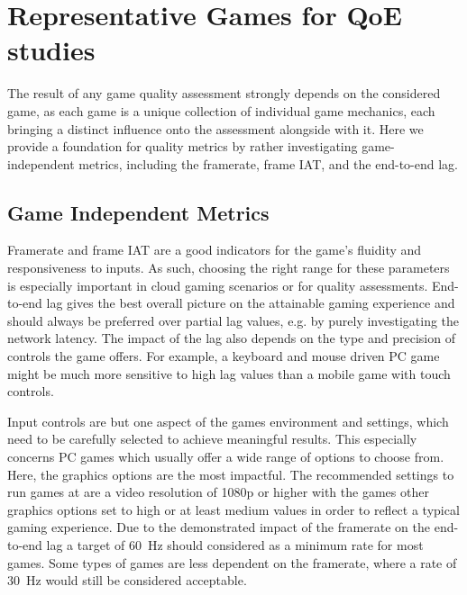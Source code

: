 \section{Representative Games for QoE studies}
\label{sec:game-criteria}

The result of any game quality assessment strongly depends on the considered game, as each game is a unique collection of individual game mechanics, each bringing a distinct influence onto the assessment alongside with it. Here we provide a foundation for quality metrics by rather investigating game-independent metrics, including the framerate, frame \gls{IAT}, and the end-to-end lag.


\subsection{Game Independent Metrics}
Framerate and frame \gls{IAT} are a good indicators for the game's fluidity and responsiveness to inputs. As such, choosing the right range for these parameters is especially important in cloud gaming scenarios or for quality assessments. End-to-end lag gives the best overall picture on the attainable gaming experience and should always be preferred over partial lag values, e.g. by purely investigating the network latency. The impact of the lag also depends on the type and precision of controls the game offers. For example, a keyboard and mouse driven PC game might be much more sensitive to high lag values than a mobile game with touch controls.

Input controls are but one aspect of the games environment and settings, which need to be carefully selected to achieve meaningful results. This especially concerns PC games which usually offer a wide range of options to choose from. Here, the graphics options are the most impactful. The recommended settings to run games at are a video resolution of 1080p or higher with the games other graphics options set to high or at least medium values in order to reflect a typical gaming experience. Due to the demonstrated impact of the framerate on the end-to-end lag a target of \SI{60}{\hertz} should considered as a minimum rate for most games. Some types of games are less dependent on the framerate, where a rate of \SI{30}{\hertz} would still be considered acceptable.

